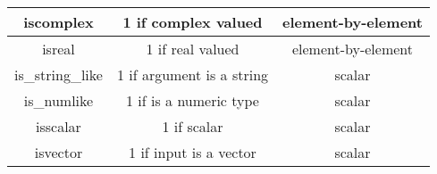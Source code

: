 \documentclass[KSmainSlides.tex]{subfiles}
\begin{document}
\begin{frame}[fragile]
	\begin{center}
		\begin{tabular}{|c|c|c|} \hline
iscomplex &1 if complex valued & element-by-element \\ \hline
isreal & 1 if real valued & element-by-element \\ \hline
is\_string\_like & 1 if argument is a string & scalar \\ \hline
is\_numlike& 1 if is a numeric type & scalar \\ \hline
isscalar & 1 if scalar & scalar \\ \hline
isvector & 1 if input is a vector & scalar \\ \hline
\end{tabular}
\end{center}

\end{frame}
\end{document}
